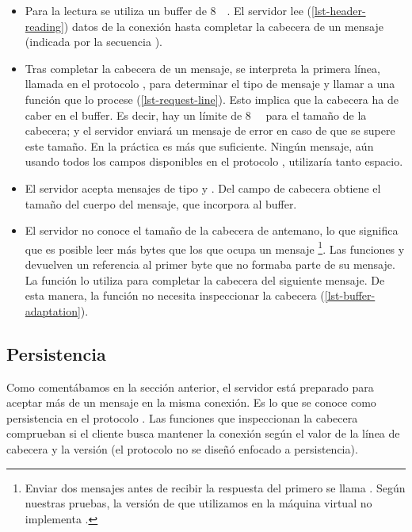 \begin{itemize}
\item Para la lectura se utiliza un buffer de \SI{8}{\kibi\byte}. El servidor lee (\cref{lst-header-reading}) datos de la conexión {\TCP} hasta completar la cabecera de un mensaje {\HTTP} (indicada por la secuencia ).

\item Tras completar la cabecera de un mensaje, se interpreta la primera línea, llamada  en el protocolo {\HTTP}, para determinar el tipo de mensaje y llamar a una función que lo procese (\cref{lst-request-line}). Esto implica que la cabecera ha de caber en el buffer. Es decir, hay un límite de \SI{8}{\kibi\byte} para el tamaño de la cabecera; y el servidor enviará un mensaje de error en caso de que se supere este tamaño. En la práctica es más que suficiente. Ningún mensaje, aún usando todos los campos disponibles en el protocolo {\HTTP}, utilizaría tanto espacio.

\item El servidor acepta mensajes de tipo {\GET} y {\POST}. Del campo de cabecera  obtiene el tamaño del cuerpo del mensaje, que incorpora al buffer.

\item El servidor no conoce el tamaño de la cabecera de antemano, lo que significa que es posible leer más bytes que los que ocupa un mensaje%
\footnote{Enviar dos mensajes antes de recibir la respuesta del primero se llama . Según nuestras pruebas, la versión de  que utilizamos en la máquina virtual no implementa .}.
Las funciones  y  devuelven un referencia al primer byte que no formaba parte de su mensaje. La función  lo utiliza para completar la cabecera del siguiente mensaje. De esta manera, la función  no necesita inspeccionar la cabecera (\cref{lst-buffer-adaptation}).
\end{itemize}






\subsection{Persistencia}
Como comentábamos en la sección anterior, el servidor está preparado para aceptar más de un mensaje en la misma conexión. Es lo que se conoce como persistencia en el protocolo {\HTTP}. Las funciones que inspeccionan la cabecera comprueban si el cliente busca mantener la conexión según el valor de la línea de cabecera  y la versión {\HTTP} (el protocolo  no se diseñó enfocado a persistencia).

